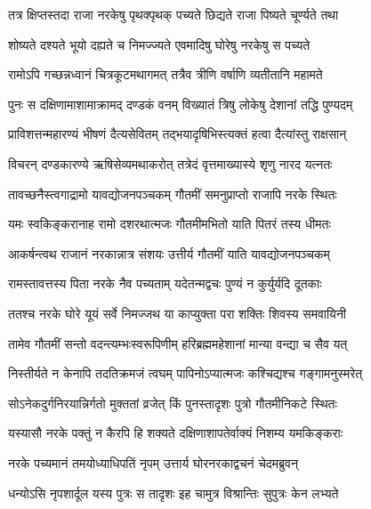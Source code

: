 \twolineshloka
{तत्र क्षिप्तस्तदा राजा नरकेषु पृथक्पृथक्}
{पच्यते छिद्यते राजा पिष्यते चूर्ण्यते तथा} %

\twolineshloka
{शोष्यते दश्यते भूयो दह्यते च निमज्ज्यते}
{एवमादिषु घोरेषु नरकेषु स पच्यते} %

\twolineshloka
{रामोऽपि गच्छन्नध्वानं चित्रकूटमथागमत्}
{तत्रैव त्रीणि वर्षाणि व्यतीतानि महामते} %

\twolineshloka
{पुनः स दक्षिणामाशामाक्रामद् दण्डकं वनम्}
{विख्यातं त्रिषु लोकेषु देशानां तद्धि पुण्यदम्} %

\twolineshloka
{प्राविशत्तन्महारण्यं भीषणं दैत्यसेवितम्}
{तद्भयादृषिभिस्त्यक्तं हत्वा दैत्यांस्तु राक्षसान्} %

\twolineshloka
{विचरन् दण्डकारण्ये ऋषिसेव्यमथाकरोत्}
{तत्रेदं वृत्तमाख्यास्ये शृणु नारद यत्नतः} %

\twolineshloka
{तावच्छनैस्त्वगाद्रामो यावद्योजनपञ्चकम्}
{गौतमीं समनुप्राप्तो राजापि नरके स्थितः} %

\twolineshloka
{यमः स्वकिङ्करानाह रामो दशरथात्मजः}
{गौतमीमभितो याति पितरं तस्य धीमतः} %

\twolineshloka
{आकर्षन्त्वथ राजानं नरकान्नात्र संशयः}
{उत्तीर्य गौतमीं याति यावद्योजनपञ्चकम्} %

\twolineshloka
{रामस्तावत्तस्य पिता नरके नैव पच्यताम्}
{यदेतन्मद्वचः पुण्यं न कुर्युर्यदि दूतकाः} %

\twolineshloka
{ततश्च नरके घोरे यूयं सर्वे निमज्जथ}
{या काप्युक्ता परा शक्तिः शिवस्य समवायिनी} %

\twolineshloka
{तामेव गौतमीं सन्तो वदन्त्यम्भःस्वरूपिणीम्}
{हरिब्रह्ममहेशानां मान्या वन्द्या च सैव यत्} %

\twolineshloka
{निस्तीर्यते न केनापि तदतिक्रमजं त्वघम्}
{पापिनोऽप्यात्मजः कश्चिद्यश्च गङ्गामनुस्मरेत्} %

\twolineshloka
{सोऽनेकदुर्गनिरयान्निर्गतो मुक्ततां व्रजेत्}
{किं पुनस्तादृशः पुत्रो गौतमीनिकटे स्थितः} %

\twolineshloka
{यस्यासौ नरके पक्तुं न कैरपि हि शक्यते}
{दक्षिणाशापतेर्वाक्यं निशम्य यमकिङ्कराः} %

\twolineshloka
{नरके पच्यमानं तमयोध्याधिपतिं नृपम्}
{उत्तार्य घोरनरकाद्वचनं चेदमब्रुवन्} %



\twolineshloka
{धन्योऽसि नृपशार्दूल यस्य पुत्रः स तादृशः}
{इह चामुत्र विश्रान्तिः सुपुत्रः केन लभ्यते} %



